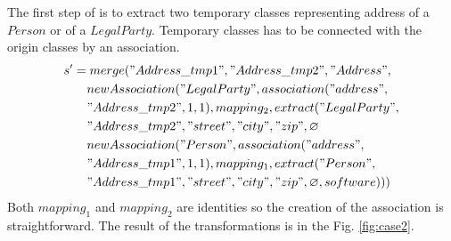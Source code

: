 \documentclass[11pt]{article}
\begin{document}
The first  step of is to extract two temporary classes representing address of a $Person$ or of a $LegalParty$. Temporary classes has to be connected with the origin classes by an association.
\begin{align*}
 s' &= merge("Address\_tmp1", "Address\_tmp2", "Address", \\
& \;\;\;\;  newAssociation("LegalParty", association("address", \\
& \;\;\;\; "Address\_tmp2", 1, 1), mapping_2, extract("LegalParty", \\
& \;\;\;\;  "Address\_tmp2", "street", "city", "zip", \varnothing  \\
& \;\;\;\; newAssociation("Person", association("address", \\
& \;\;\;\; "Address\_tmp1", 1, 1), mapping_1, extract("Person", \\
& \;\;\;\; "Address\_tmp1", "street", "city", "zip", \varnothing, software)))
\end{align*}
Both $mapping_1$ and $mapping_2$ are identities so the creation of the association is straightforward. The result of the transformations is in the Fig. \ref{fig:case2}. 
\end{document}
